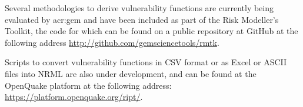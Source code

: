 Several methodologies to derive \glspl{vulnerability function} are currently being
evaluated by \gls{acr:gem} and have been included as part of the Risk
Modeller's Toolkit, the code for which can be found on a public repository at
GitHub at the following address
\href{http://github.com/gemsciencetools/rmtk}{http://github.com/gemsciencetools/rmtk}.

Scripts to convert \glspl{vulnerability function} in CSV format or as Excel or
ASCII files into NRML are also under development, and can be found at the
OpenQuake platform at the following address:
\href{https://platform.openquake.org/ript/}{https://platform.openquake.org/ript/}.
